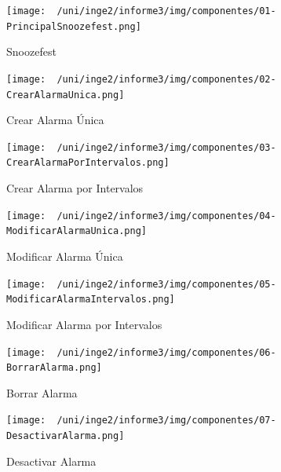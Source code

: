 \begin{figure}[H]
	\centering
	\texttt{[image: ~/uni/inge2/informe3/img/componentes/01-PrincipalSnoozefest.png]}
	\caption{Snoozefest}
        \vspace{5pt}
	\label{fig:Snoozefest}
\end{figure}

\begin{figure}[H]
	\centering
	\texttt{[image: ~/uni/inge2/informe3/img/componentes/02-CrearAlarmaUnica.png]}
	\caption{Crear Alarma Única}
        \vspace{5pt}
	\label{fig:Crear Alarma Única}
\end{figure}

\begin{figure}[H]
	\centering
	\texttt{[image: ~/uni/inge2/informe3/img/componentes/03-CrearAlarmaPorIntervalos.png]}
	\caption{Crear Alarma por Intervalos}
        \vspace{5pt}
	\label{fig:Crear Alarma por Intervalos}
\end{figure}

\begin{figure}[H]
	\centering
	\texttt{[image: ~/uni/inge2/informe3/img/componentes/04-ModificarAlarmaUnica.png]}
	\caption{Modificar Alarma Única}
        \vspace{5pt}
	\label{fig:Modificar Alarma Única}
\end{figure}

\begin{figure}[H]
	\centering
	\texttt{[image: ~/uni/inge2/informe3/img/componentes/05-ModificarAlarmaIntervalos.png]}
	\caption{Modificar Alarma por Intervalos}
        \vspace{5pt}
	\label{fig:Modificar Alarma por Intervalos}
\end{figure}

\begin{figure}[H]
	\centering
	\texttt{[image: ~/uni/inge2/informe3/img/componentes/06-BorrarAlarma.png]}
	\caption{Borrar Alarma}
        \vspace{5pt}
	\label{fig:Borrar Alarma}
\end{figure}

\begin{figure}[H]
	\centering
	\texttt{[image: ~/uni/inge2/informe3/img/componentes/07-DesactivarAlarma.png]}
	\caption{Desactivar Alarma}
        \vspace{5pt}
	\label{fig:Desactivar Alarma}
\end{figure}


